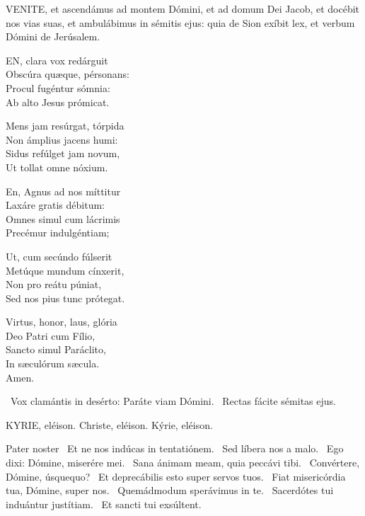 
\lettrine[lines=2]{V}{ENITE}, et ascendámus ad montem Dómini, et ad domum Dei Jacob, et docébit nos vias suas, et ambulábimus in sémitis ejus: quia de Sion exíbit lex, et verbum Dómini de Jerúsalem.


\lettrine[lines=2]{E}{N}, clara vox redárguit\\
Obscúra quæque, pérsonans:\\
Procul fugéntur sómnia:\\
Ab alto Jesus prómicat.

Mens jam resúrgat, tórpida\\
Non ámplius jacens humi:\\
Sidus refúlget jam novum,\\
Ut tollat omne nóxium.

En, Agnus ad nos míttitur\\
Laxáre gratis débitum:\\
Omnes simul cum lácrimis\\
Precémur indulgéntiam;

Ut, cum secúndo fúlserit\\
Metúque mundum cínxerit,\\
Non pro reátu púniat,\\
Sed nos pius tunc prótegat.

Virtus, honor, laus, glória\\
Deo Patri cum Fílio,\\
Sancto simul Paráclito,\\
In sæculórum sæcula.\\
Amen.

\V\ Vox clamántis in desérto: Paráte viam Dómini. \R\ Rectas fácite sémitas ejus.



\label{feria4:precesferiales}

KYRIE, eléison. Christe, eléison. Kýrie, eléison.

Pater noster  \V\ Et ne nos indúcas in tentatiónem. \R\ Sed líbera nos a malo. \V\ Ego dixi: Dómine, miserére mei. \R\ Sana ánimam meam, quia peccávi tibi. \V\ Convértere, Dómine, úsquequo? \R\ Et deprecábilis esto super servos tuos. \V\ Fiat misericórdia tua, Dómine, super nos. \R\ Quemádmodum sperávimus in te. \V\ Sacerdótes tui induántur justítiam. \R\ Et sancti tui exsúltent.

